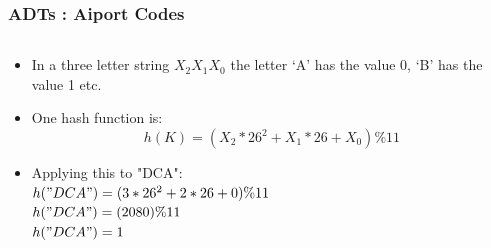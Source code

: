 \begin{frame}[fragile]
\frametitle{ADTs : Aiport Codes}
\begin{columns}[T]

\begin{column}{0.35\textwidth}
\begin{itemize}[<+->]
\item In a three letter string $X_2 X_1 X_0$ the letter `A' has the value 0, `B' has the
value 1 etc.
\item One hash function is:
\[
h(K) = (X_2*26^2 + X_1*26 + X_0)\%11
\]
\item Applying this to "DCA":\\

$ h("DCA") = (3*26^2 + 2*26 + 0)\%11$\\

$ h("DCA") = (2080)\%11$\\

$ h("DCA") = 1 $
\end{itemize}
\end{column}


\end{columns}
\end{frame}

